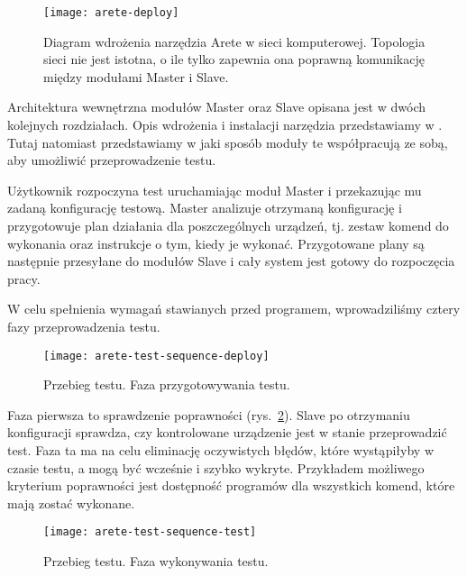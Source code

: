 \documentclass[00-praca-magisterska.tex]{subfiles}
\begin{document}
\begin{figure}
\begin{center}
\leavevmode
\texttt{[image: arete-deploy]}
\end{center}
\caption{Diagram wdrożenia narzędzia Arete w sieci komputerowej. Topologia
sieci nie jest istotna, o ile tylko zapewnia ona poprawną komunikację między
modułami Master i Slave.}
\label{fig:arete-deploy}
\end{figure}

Architektura wewnętrzna modułów Master oraz Slave opisana jest w dwóch
kolejnych rozdziałach. Opis wdrożenia i instalacji narzędzia przedstawiamy w
. Tutaj natomiast przedstawiamy w jaki sposób
moduły te współpracują ze sobą, aby umożliwić przeprowadzenie testu.

Użytkownik rozpoczyna test uruchamiając moduł Master i przekazując mu zadaną
konfigurację testową. Master analizuje otrzymaną konfigurację i przygotowuje
plan działania dla poszczególnych urządzeń, tj. zestaw komend do wykonania oraz
instrukcje o tym, kiedy je wykonać. Przygotowane plany są następnie przesyłane
do modułów Slave i cały system jest gotowy do rozpoczęcia pracy.

W celu spełnienia wymagań stawianych przed programem, wprowadziliśmy cztery
fazy przeprowadzenia testu.

\begin{figure}
\begin{center}
\leavevmode
\texttt{[image: arete-test-sequence-deploy]}
\end{center}
\caption{Przebieg testu. Faza przygotowywania testu.}
\label{fig:arete-test-seq-deploy}
\end{figure}

Faza pierwsza to sprawdzenie poprawności (rys.~\ref{fig:arete-test-seq-deploy}).
Slave po otrzymaniu konfiguracji sprawdza, czy kontrolowane urządzenie jest w
stanie przeprowadzić test. Faza ta ma na celu eliminację oczywistych błędów,
które wystąpiłyby w czasie testu, a mogą być wcześnie i szybko wykryte.
Przykładem możliwego kryterium poprawności jest dostępność programów dla
wszystkich komend, które mają zostać wykonane.

\begin{figure}
\begin{center}
\leavevmode
\texttt{[image: arete-test-sequence-test]}
\end{center}
\caption{Przebieg testu. Faza wykonywania testu.}
\label{fig:arete-test-seq-test}
\end{figure}
\end{document}
